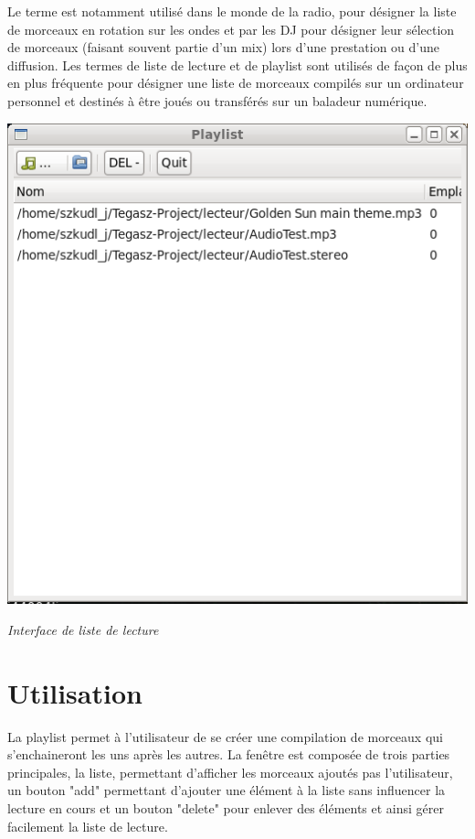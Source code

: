 \documentclass[12pt,a4paper]{report}
\begin{document}
Le terme est notamment utilisé dans le monde de la radio, pour désigner la liste de morceaux en rotation sur les ondes et par les DJ pour désigner leur sélection de morceaux (faisant souvent partie d'un mix) lors d'une prestation ou d'une diffusion.
Les termes de liste de lecture et de playlist sont utilisés de façon de plus en plus fréquente pour désigner une liste de morceaux compilés sur un ordinateur personnel et destinés à être joués ou transférés sur un baladeur numérique.


\begin{center}
\includegraphics[scale=0.5]{playlist.png}

\it{Interface de liste de lecture}
\end{center}

\section{Utilisation}

La playlist permet à l'utilisateur de se créer une compilation de morceaux qui s'enchaineront les uns après les autres. La fenêtre est composée de trois parties principales, la liste, permettant d'afficher les morceaux ajoutés pas l'utilisateur, un bouton "add" permettant d'ajouter une élément à la liste sans influencer la lecture en cours et un bouton "delete" pour enlever des éléments et ainsi gérer facilement la liste de lecture.\\
\end{document}
